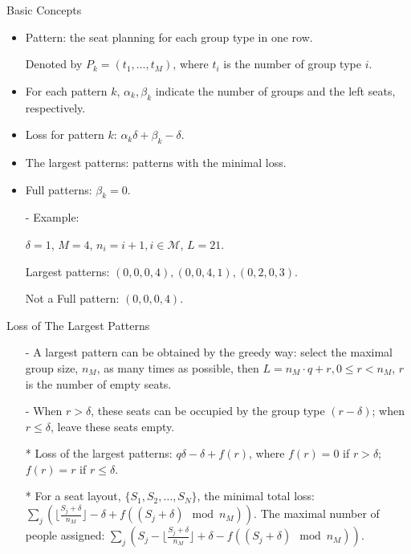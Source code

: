   \begin{frame}{Basic Concepts}
    \begin{itemize}
      \item Pattern: the seat planning for each group type in one row. 
      
      Denoted by $P_{k} = (t_1, \ldots, t_M)$, where $t_i$ is the number of group type $i$.
      \item For each pattern $k$, $\alpha_k, \beta_k$ indicate the number of groups and the left seats, respectively.
      \item Loss for pattern $k$: $\alpha_k \delta + \beta_k - \delta$.
      \item The largest patterns: patterns with the minimal loss. 
      \item Full patterns: $\beta_k =0$.
      \item[-] Example: 
      
      $\delta = 1$, $M =4$, $n_i = i+1, i \in \mathcal{M}$, $L = 21$.
      
      Largest patterns: $(0, 0, 0, 4), (0, 0, 4, 1), (0, 2, 0, 3)$.
      
      Not a Full pattern: $(0, 0, 0, 4)$.
    \end{itemize}
  \end{frame}


  \begin{frame}{Loss of The Largest Patterns}
    \begin{itemize}
      \item[-] A largest pattern can be obtained by the greedy way: select the maximal group size, $n_{M}$, as many times as possible, then $L = n_{M} \cdot q + r, 0 \leq r < n_{M}$, $r$ is the number of empty seats. 
      \item[-] When $r > \delta$, these seats can be occupied by the group type $(r-\delta)$; when $r \leq \delta$, leave these seats empty.
      \item[*] Loss of the largest patterns: $q \delta -\delta + f(r)$, where $f(r) =0$ if $r > \delta$; $f(r) = r$ if $r \leq \delta$.
      \item[*] For a seat layout, $\{S_1, S_2, \ldots, S_{N}\}$, the minimal total loss: $\sum_{j} (\lfloor \frac{S_j+\delta}{n_{M}} \rfloor -\delta + f((S_j + \delta) \mod n_{M}))$. The maximal number of people assigned: $\sum_{j} (S_j - \lfloor \frac{S_j+\delta}{n_{M}} \rfloor + \delta - f((S_j +\delta)\mod n_{M}))$.
    \end{itemize}
  \end{frame}
  
